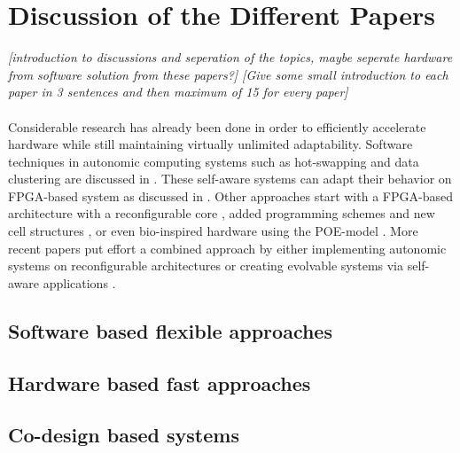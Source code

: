 
\section{Discussion of the Different Papers}
\label{sec:discussion}

\emph{[introduction to discussions and seperation of the topics, maybe seperate hardware from software solution from these papers?]
[Give some small introduction to each paper in 3 sentences and then maximum of 15 for every paper]}
\\
\\
Considerable research has already been done in order to efficiently accelerate hardware while still maintaining virtually unlimited adaptability. 
Software techniques in autonomic computing systems such as hot-swapping and data clustering are discussed in \cite{survey}. 
These self-aware systems can adapt their behavior on FPGA-based system as discussed in \cite{selfaware}.
Other approaches start with a FPGA-based architecture with a reconfigurable core \cite{drp},  added programming schemes and new cell structures \cite{virtex4}, \cite{erlangen} or even bio-inspired hardware using the POE-model \cite{poe}.
More recent papers put effort a combined approach by either implementing autonomic systems on reconfigurable architectures \cite{reconfigurable} or creating evolvable systems via self-aware applications \cite{evolvable}.


\subsection{Software based flexible approaches}
\label{sec:software}



\subsection{Hardware based fast approaches}
\label{sec:hardware}


\subsection{Co-design based systems}
\label{sec:codesign}





